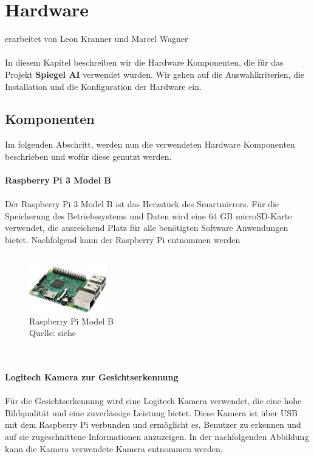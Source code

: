\chapter{Hardware}
erarbeitet von Leon Kranner und Marcel Wagner \\ \\
\noindent
In diesem Kapitel beschreiben wir die Hardware Komponenten, die für das Projekt \textbf{Spiegel AI} verwendet wurden. Wir gehen auf die Auswahlkriterien, die Installation und die Konfiguration der Hardware ein.

\section{Komponenten}
Im folgenden Abschritt, werden nun die verwendeten Hardware Komponenten beschrieben und wofür diese genutzt werden. \\ \\
\noindent
\textbf{Raspberry Pi 3 Model B} \\ \\
Der Raspberry Pi 3 Model B ist das Herzstück des Smartmirrors. Für die Speicherung des Betriebssystems und Daten wird eine 64 GB microSD-Karte verwendet, die ausreichend Platz für alle benötigten Software Anwendungen bietet. Nachfolgend kann der Raspberry Pi entnommen werden\\ \\
\noindent
\begin{figure}[h]
    \centering
    \includegraphics[width=0.3\textwidth]{pictures/raspberry_pi.jpg}
  \captionsetup{justification=centering, labelformat=simple, singlelinecheck=false}
    \caption[Raspberry Pi Model B]{Raspberry Pi Model B\\ Quelle: siehe \cite{raspberry_pi}}
\end{figure} \\ \\
\noindent
\textbf{Logitech Kamera zur Gesichtserkennung} \\ \\
Für die Gesichtserkennung wird eine Logitech Kamera verwendet, die eine hohe Bildqualität und eine zuverlässige Leistung bietet. Diese Kamera ist über USB mit dem Raspberry Pi verbunden und ermöglicht es, Benutzer zu erkennen und auf sie zugeschnittene Informationen anzuzeigen. In der nachfolgenden Abbildung kann die Kamera verwendete Kamera entnommen werden.\\ \\
